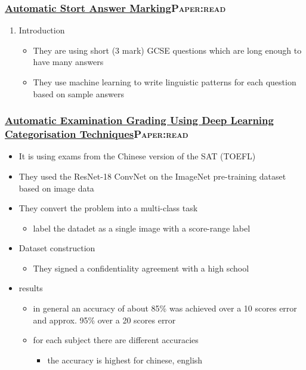 \documentclass[11pt]{article}
\begin{document}
\subsubsection{\href{./cs/Automatic\_Short\_Answer\_marking.pdf}{Automatic Stort Answer Marking}\hfill{}\textsc{Paper:read}}
\label{sec:org5bf733b}
\begin{enumerate}
\item Introduction
\label{sec:orge63d416}
\begin{itemize}
\item They are using short (3 mark) GCSE questions which are long enough to have many answers
\item They use machine learning to write linguistic patterns for each question based on sample answers
\end{itemize}
\end{enumerate}
\subsubsection{\href{./cs/AutomatedExaminationGradingUsingDeepLearningCategorizationTechniques.pdf}{Automatic Examination Grading Using Deep Learning Categorisation Techniques}\hfill{}\textsc{Paper:read}}
\label{sec:org8941ae6}
\begin{itemize}
\item It is using exams from the Chinese version of the SAT (TOEFL)
\item They used the ResNet-18 ConvNet on the ImageNet pre-training dataset based on image data
\item They convert the problem into a multi-class task
\begin{itemize}
\item label the datadet as a single image with a score-range label
\end{itemize}
\item Dataset construction
\begin{itemize}
\item They signed a confidentiality agreement with a high school
\end{itemize}
\item results
\begin{itemize}
\item in general an accuracy of about 85\% was achieved over a 10 scores error and approx. 95\% over a 20 scores error
\item for each subject there are different accuracies
\begin{itemize}
\item the accuracy is highest for chinese, english
\end{itemize}
\end{itemize}
\end{itemize}
\end{document}
